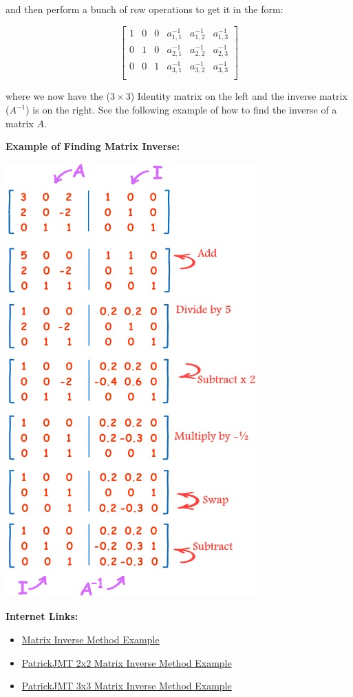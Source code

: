 \documentclass[12pt]{article}
\begin{document}
\begin{itemize}
and then perform a bunch of row operations to get it in the form:

\[
\left[
\begin{array}{ccc|ccc}
1 & 0 & 0 & a_{1,1}^{-1} & a_{1,2}^{-1} & a_{1,3}^{-1} \\[1em]
0 & 1 & 0 & a_{2,1}^{-1} & a_{2,2}^{-1} & a_{2,3}^{-1} \\[1em]
0 & 0 & 1 & a_{3,1}^{-1} & a_{3,2}^{-1} & a_{3,3}^{-1} \\
\end{array}
\right]
\]

where we now have the ($3 \times 3$) Identity matrix on the left and the inverse matrix ($A^{-1}$) is on the right. See the following example of how to find the inverse of a matrix $A$.
\end{itemize}

\textbf{Example of Finding Matrix Inverse:}

\includegraphics{InverseMatrixMethod.jpg}

\textbf{Internet Links:}
\begin{itemize}
\item \href{http://math.uww.edu/~mcfarlat/matrix.htm}{Matrix Inverse Method Example}
\item \href{https://www.youtube.com/watch?v=Re1F4d24Fxc}{PatrickJMT 2x2 Matrix Inverse Method Example}
\item \href{https://www.youtube.com/watch?v=hu6B1d3vvqU}{PatrickJMT 3x3 Matrix Inverse Method Example}
\end{itemize}
\end{document}
